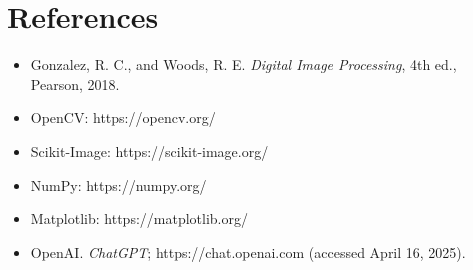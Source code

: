 \documentclass[12pt]{article}
\begin{document}
\section{References}
\begin{itemize}
    \item Gonzalez, R. C., and Woods, R. E. \textit{Digital Image Processing}, 4th ed., Pearson, 2018.
    \item OpenCV: https://opencv.org/
    \item Scikit-Image: https://scikit-image.org/
    \item NumPy: https://numpy.org/
    \item Matplotlib: https://matplotlib.org/
    \item OpenAI. \textit{ChatGPT}; https://chat.openai.com (accessed April 16, 2025).
\end{itemize}
\end{document}
